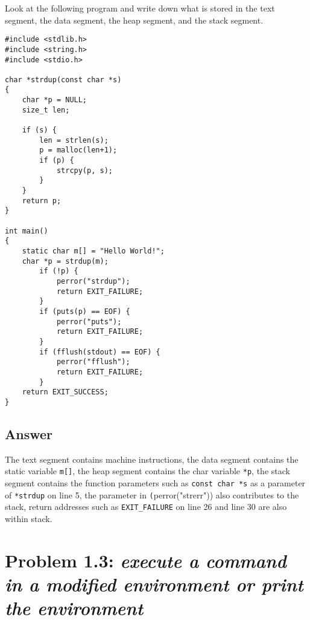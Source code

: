\documentclass[
	12pt, %
]{fphw}
\begin{document}
\begin{problem}
	Look at the following program and write down what is stored in the text segment, the data segment,
	the heap segment, and the stack segment.\end{problem}
	\medskip
	\begin{lstlisting}[style=CStyle]
#include <stdlib.h>
#include <string.h>
#include <stdio.h>

char *strdup(const char *s)
{
	char *p = NULL;
	size_t len;

	if (s) {
		len = strlen(s);
		p = malloc(len+1);
		if (p) {
			strcpy(p, s);
		}
	}
	return p;
}

int main()
{
	static char m[] = "Hello World!";
	char *p = strdup(m);
		if (!p) {
			perror("strdup");
			return EXIT_FAILURE;
		}
		if (puts(p) == EOF) {
			perror("puts");
			return EXIT_FAILURE;
		}
		if (fflush(stdout) == EOF) {
			perror("fflush");
			return EXIT_FAILURE;
		}
	return EXIT_SUCCESS;
}\end{lstlisting}
\subsection*{Answer}
The text segment contains machine instructions, the data segment contains the static variable \texttt{m[]}, the heap segment contains the char variable \texttt{*p}, the stack segment contains the function parameters such as \texttt{const char *s} as a parameter of \texttt{*strdup} on line 5, the parameter in \texttt(perror("strerr")) also contributes to the stack, return addresses such as \texttt{EXIT\_FAILURE} on line 26 and line 30 are also within stack. 

\section*{Problem 1.3: \emph{execute a command in a modified environment or print the environment}}
\end{document}

